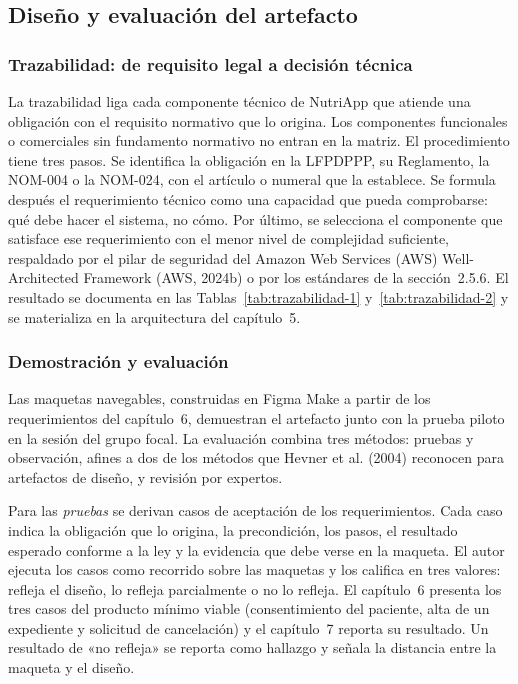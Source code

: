\documentclass[12pt, a4paper]{article}
\begin{document}
\subsection{Diseño y evaluación del artefacto}
 
\subsubsection{Trazabilidad: de requisito legal a decisión técnica}
 
La trazabilidad liga cada componente técnico de NutriApp que atiende una
obligación con el requisito normativo que lo origina. Los componentes
funcionales o comerciales sin fundamento normativo no entran en la
matriz. El procedimiento tiene tres pasos. Se identifica
la obligación en la LFPDPPP, su Reglamento, la NOM-004 o la NOM-024,
con el artículo o numeral que la establece. Se formula después el
requerimiento técnico como una capacidad que pueda comprobarse: qué
debe hacer el sistema, no cómo. Por último, se selecciona el componente
que satisface ese requerimiento con el menor nivel de complejidad
suficiente, respaldado por el pilar de seguridad del Amazon Web Services
(AWS) Well-Architected Framework (AWS, 2024b) o por los estándares de la
sección~2.5.6. El resultado se
documenta en las Tablas~\ref{tab:trazabilidad-1}
y~\ref{tab:trazabilidad-2} y se materializa en la arquitectura del
capítulo~5.
 
\subsubsection{Demostración y evaluación}
 
Las maquetas navegables, construidas en Figma Make a partir de los
requerimientos del capítulo~6, demuestran el artefacto junto con la
prueba piloto en la sesión del grupo focal. La evaluación
combina tres métodos: pruebas y observación, afines a dos de los
métodos que Hevner et al. (2004) reconocen para artefactos de diseño, y
revisión por expertos.
 
Para las \textit{pruebas} se derivan casos de aceptación de los
requerimientos. Cada caso indica la obligación que lo origina, la
precondición, los pasos, el resultado esperado conforme a la ley y la
evidencia que debe verse en la maqueta. El autor ejecuta los casos como
recorrido sobre las maquetas y los califica en tres valores: refleja
el diseño, lo refleja parcialmente o no lo refleja. El capítulo~6
presenta los tres casos del producto mínimo viable (consentimiento del
paciente, alta de un expediente y solicitud de cancelación) y el
capítulo~7 reporta su resultado. Un resultado de «no refleja» se
reporta como hallazgo y señala la distancia entre la maqueta y el
diseño.
 
\end{document}
